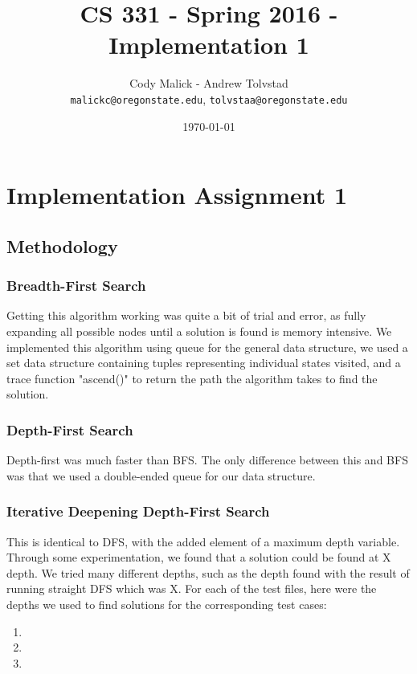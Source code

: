 \documentclass[10pt,letterpaper]{article}
\begin{document}
\begin{titlepage}
  \title{CS 331 - Spring 2016 - Implementation 1}
  \author{Cody Malick - Andrew Tolvstad\\
  \texttt{malickc@oregonstate.edu}, \texttt{tolvstaa@oregonstate.edu}}
  \date{\today}
  \maketitle
  \vspace*{2cm}

\end{titlepage}

\section{Implementation Assignment 1}
	\subsection{Methodology}
	\subsubsection{Breadth-First Search}
Getting this algorithm working was quite a bit of trial and error, as fully
expanding all possible nodes until a solution is found is memory intensive.
We implemented this algorithm using queue for the general data structure, we
used a set data structure containing tuples representing individual states
visited, and a trace function "ascend()" to return the path the algorithm takes
to find the solution.


	\subsubsection{Depth-First Search}
Depth-first was much faster than BFS. The only difference between this and BFS
was that we used a double-ended queue for our data structure.

	\subsubsection{Iterative Deepening Depth-First Search}
This is identical to DFS, with the added element of a maximum depth variable.
Through some experimentation, we found that a solution could be found at X depth.
We tried many different depths, such as the depth found with the result of running
straight DFS which was X. For each of the test files, here were the depths we
used to find solutions for the corresponding test cases:
\begin{enumerate}
  \item
  \item
  \item
\end{enumerate}
\end{document}
